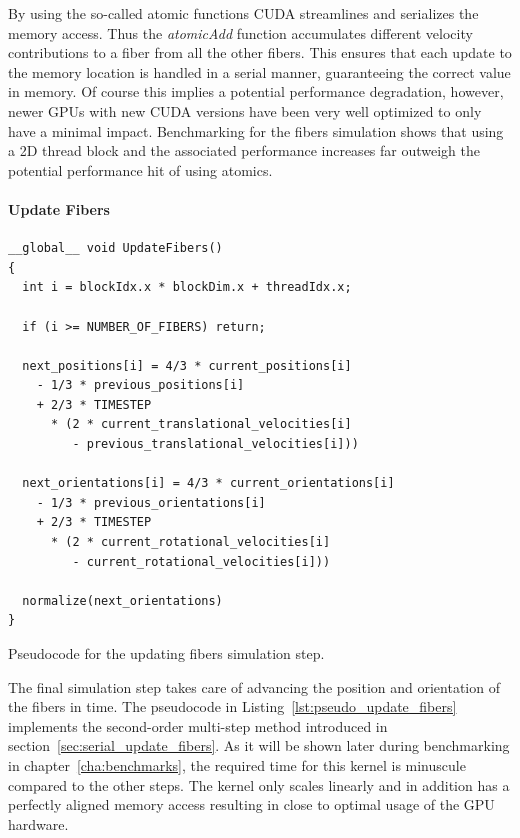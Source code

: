 \documentclass[a4paper,11pt]{kth-mag}
\begin{document}
By using the so-called atomic functions CUDA streamlines and serializes the memory access. Thus the \emph{atomicAdd} function accumulates different velocity contributions to a fiber from all the other fibers. This ensures that each update to the memory location is handled in a serial manner, guaranteeing the correct value in memory. Of course this implies a potential performance degradation, however, newer GPUs with new CUDA versions have been very well optimized to only have a minimal impact. Benchmarking for the fibers simulation shows that using a 2D thread block and the associated performance increases far outweigh the potential performance hit of using atomics.

\paragraph{Update Fibers}

\begin{listing}[!htbp]
  \centering
  \begin{verbatim}
__global__ void UpdateFibers()
{
  int i = blockIdx.x * blockDim.x + threadIdx.x;

  if (i >= NUMBER_OF_FIBERS) return;

  next_positions[i] = 4/3 * current_positions[i]
    - 1/3 * previous_positions[i]
    + 2/3 * TIMESTEP
      * (2 * current_translational_velocities[i]
         - previous_translational_velocities[i]))

  next_orientations[i] = 4/3 * current_orientations[i]
    - 1/3 * previous_orientations[i]
    + 2/3 * TIMESTEP
      * (2 * current_rotational_velocities[i]
         - current_rotational_velocities[i]))

  normalize(next_orientations)
}
  \end{verbatim}
  \caption{Pseudocode for the updating fibers simulation step.}
  \label{lst:pseudo_update_fibers}
\end{listing}

The final simulation step takes care of advancing the position and orientation of the fibers in time. The pseudocode in Listing~\ref{lst:pseudo_update_fibers} implements the second-order multi-step method introduced in section~\ref{sec:serial_update_fibers}. As it will be shown later during benchmarking in chapter~\ref{cha:benchmarks}, the required time for this kernel is minuscule compared to the other steps. The kernel only scales linearly and in addition has a perfectly aligned memory access resulting in close to optimal usage of the GPU hardware.
\end{document}
